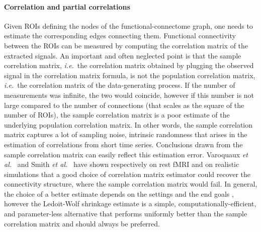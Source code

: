 \documentclass[5p]{elsarticle}
\begin{document}
\paragraph{Correlation and partial correlations}
%
Given ROIs defining the nodes of the functional-connectome graph,
one needs to estimate the corresponding edges connecting them.
Functional connectivity between the ROIs can be measured by computing the
correlation matrix of the extracted signals. An important and often
neglected point is that the sample correlation matrix, \emph{i.e.}\ the
correlation matrix obtained by plugging the observed signal in the
correlation matrix formula, is not the population correlation matrix,
\emph{i.e.}\ the correlation matrix of the data-generating process. If the
number of measurements was infinite, the two would coincide, however if
this number is not large compared to the number of connections (that
scales as the square of the number of ROIs), the sample correlation
matrix is a poor estimate of the underlying population correlation
matrix. In other words, the sample correlation matrix captures a lot of
sampling noise, intrinsic randomness that arises in the estimation of
correlations from short time series. Conclusions drawn from the sample
correlation matrix can easily reflect this estimation error.
%
Varoquaux \emph{et al.}~\cite{varoquaux2010c} and Smith \emph{et
al.}~\cite{smith2011} have shown respectively on rest fMRI and on
realistic simulations that a good choice of correlation matrix estimator
could recover the connectivity structure, where the sample correlation
matrix would fail.  In general, the choice of a better estimate depends on
the settings and the end goals \cite{varoquaux2012,varoquaux2010b},
however the Ledoit-Wolf shrinkage estimate \cite{ledoit2004} is a simple,
computationally-efficient, and parameter-less alternative that performs
uniformly better than the sample correlation matrix
\cite{varoquaux2012,varoquaux2010c} and should always be preferred.
\end{document}
